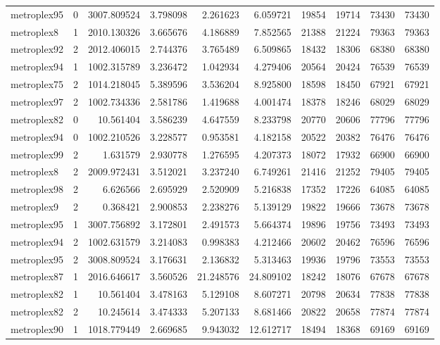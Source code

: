 \begin{longtable}{|l|r|r|r|r|r|r|r|r|r|}
metroplex95 & 0 & 3007.809524 & 3.798098 & 2.261623 & 6.059721 & 19854 & 19714 & 73430 & 73430 \\
metroplex8 & 1 & 2010.130326 & 3.665676 & 4.186889 & 7.852565 & 21388 & 21224 & 79363 & 79363 \\
metroplex92 & 2 & 2012.406015 & 2.744376 & 3.765489 & 6.509865 & 18432 & 18306 & 68380 & 68380 \\
metroplex94 & 1 & 1002.315789 & 3.236472 & 1.042934 & 4.279406 & 20564 & 20424 & 76539 & 76539 \\
metroplex75 & 2 & 1014.218045 & 5.389596 & 3.536204 & 8.925800 & 18598 & 18450 & 67921 & 67921 \\
metroplex97 & 2 & 1002.734336 & 2.581786 & 1.419688 & 4.001474 & 18378 & 18246 & 68029 & 68029 \\
metroplex82 & 0 & 10.561404 & 3.586239 & 4.647559 & 8.233798 & 20770 & 20606 & 77796 & 77796 \\
metroplex94 & 0 & 1002.210526 & 3.228577 & 0.953581 & 4.182158 & 20522 & 20382 & 76476 & 76476 \\
metroplex99 & 2 & 1.631579 & 2.930778 & 1.276595 & 4.207373 & 18072 & 17932 & 66900 & 66900 \\
metroplex8 & 2 & 2009.972431 & 3.512021 & 3.237240 & 6.749261 & 21416 & 21252 & 79405 & 79405 \\
metroplex98 & 2 & 6.626566 & 2.695929 & 2.520909 & 5.216838 & 17352 & 17226 & 64085 & 64085 \\
metroplex9 & 2 & 0.368421 & 2.900853 & 2.238276 & 5.139129 & 19822 & 19666 & 73678 & 73678 \\
metroplex95 & 1 & 3007.756892 & 3.172801 & 2.491573 & 5.664374 & 19896 & 19756 & 73493 & 73493 \\
metroplex94 & 2 & 1002.631579 & 3.214083 & 0.998383 & 4.212466 & 20602 & 20462 & 76596 & 76596 \\
metroplex95 & 2 & 3008.809524 & 3.176631 & 2.136832 & 5.313463 & 19936 & 19796 & 73553 & 73553 \\
metroplex87 & 1 & 2016.646617 & 3.560526 & 21.248576 & 24.809102 & 18242 & 18076 & 67678 & 67678 \\
metroplex82 & 1 & 10.561404 & 3.478163 & 5.129108 & 8.607271 & 20798 & 20634 & 77838 & 77838 \\
metroplex82 & 2 & 10.245614 & 3.474333 & 5.207133 & 8.681466 & 20822 & 20658 & 77874 & 77874 \\
metroplex90 & 1 & 1018.779449 & 2.669685 & 9.943032 & 12.612717 & 18494 & 18368 & 69169 & 69169 \\

\end{longtable}
